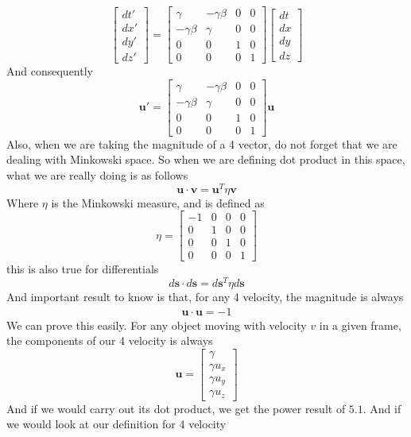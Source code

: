 \documentclass[12pt]{book}
\begin{document}
\[
\begin{bmatrix}
dt' \\
dx' \\
dy' \\
dz'
\end{bmatrix}
=
\begin{bmatrix}
\gamma & -\gamma\beta & 0 & 0 \\
-\gamma\beta & \gamma & 0 & 0 \\
0 & 0 & 1 & 0 \\
0 & 0 & 0 & 1
\end{bmatrix}
\begin{bmatrix}
dt \\
dx \\
dy \\
dz
\end{bmatrix}
\]
And consequently
\[
\mathbf{u}' = \begin{bmatrix}
\gamma & -\gamma\beta & 0 & 0 \\
-\gamma\beta & \gamma & 0 & 0 \\
0 & 0 & 1 & 0 \\
0 & 0 & 0 & 1
\end{bmatrix}\mathbf{u}
\]
Also, when we are taking the magnitude of a 4 vector, do not forget that we are dealing with Minkowski space. So when we are defining dot product in this space, what we are really doing is as follows
\[
\mathbf{u}\cdot \mathbf{v} = \mathbf{u}^T\eta\mathbf{v}
\]
Where $\eta$ is the Minkowski measure, and is defined as
\[
\eta = \begin{bmatrix}
    -1&0&0&0\\
    0&1&0&0\\
    0&0&1&0\\
    0&0&0&1
\end{bmatrix}
\]
this is also true for differentials
\[
d\mathbf{s}\cdot d\mathbf{s} = d\mathbf{s}^T\eta d\mathbf{s}
\]
And important result to know is that, for any 4 velocity, the magnitude is always
\begin{align}
\mathbf{u}\cdot \mathbf{u} = -1
\end{align}
We can prove this easily. For any object moving with velocity $v$ in a given frame, the components of our 4 velocity is always
\[
\mathbf{u}=\begin{bmatrix}
    \gamma\\ \gamma u_x \\ \gamma u_y \\\gamma u_z 
\end{bmatrix}
\]
And if we would carry out its dot product, we get the power result of $5.1$. And if we would look at our definition for 4 velocity
\end{document}
